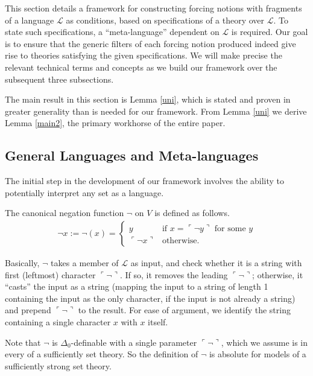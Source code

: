 \documentclass[12pt]{article}
\numberwithin{equation}{section}
\begin{document}
This section details a framework for constructing forcing notions with fragments of a language $\mathcal{L}$ as conditions, based on specifications of a theory over $\mathcal{L}$. To state such specifications, a ``meta-language'' dependent on $\mathcal{L}$ is required. Our goal is to ensure that the generic filters of each forcing notion produced indeed give rise to theories satisfying the given specifications. We will make precise the relevant technical terms and concepts as we build our framework over the subsequent three subsections. 

The main result in this section is Lemma \ref{uni}, which is stated and proven in greater generality than is needed for our framework. From Lemma \ref{uni} we derive Lemma \ref{main2}, the primary workhorse of the entire paper.

\subsection{General Languages and Meta-languages}

The initial step in the development of our framework involves the ability to potentially interpret any set as a language. 

\begin{defi}\label{neg}
The canonical negation function $\neg$ on $V$ is defined as follows. 
\begin{align*}
    \neg x := \neg(x) = 
    \begin{cases}
        y & \text{if } x = \ulcorner \neg y \urcorner \text{ for some } y \\
        \ulcorner \neg x \urcorner & \text{otherwise}.
    \end{cases}
\end{align*}
\end{defi}

Basically, $\neg$ takes a member of $\mathcal{L}$ as input, and check whether it is a string with first (leftmost) character $\ulcorner \neg \urcorner$. If so, it removes the leading $\ulcorner \neg \urcorner$; otherwise, it ``casts'' the input as a string (mapping the input to a string of length 1 containing the input as the only character, if the input is not already a string) and prepend $\ulcorner \neg \urcorner$ to the result. For ease of argument, we identify the string containing a single character $x$ with $x$ itself. 

Note that $\neg$ is $\Delta_0$-definable with a single parameter $\ulcorner \neg \urcorner$, which we assume is in every of a sufficiently set theory. So the definition of $\neg$ is absolute for models of a sufficiently strong set theory.
\end{document}
